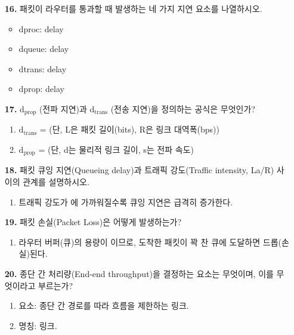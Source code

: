 \documentclass[a4paper, 10pt]{article}
\newcommand{\ansline}[1]{\underline{\hspace{#1}}}
\newcommand{\sectionbox}[1]{
  \vspace{0.5em}
  \noindent\fbox{\textbf{#1}}
  \vspace{0.5em}
}
\begin{document}
\begin{enumerate}[itemsep=2em, leftmargin=2em, label={}]
\item[] \sectionbox{IV. 성능: 지연, 손실, 처리량 (5문제)}

\item[\textbf{16.}] 패킷이 라우터를 통과할 때 발생하는 네 가지 지연 요소를 나열하시오.
\begin{itemize}[itemsep=0.3em, leftmargin=1.5em]
    \item dproc: \ansline{3cm} delay
    \item dqueue: \ansline{3cm} delay
    \item dtrans: \ansline{3cm} delay
    \item dprop: \ansline{3cm} delay
\end{itemize}

\item[\textbf{17.}] $\text{d}_{\text{prop}}$ (전파 지연)과 $\text{d}_{\text{trans}}$ (전송 지연)을 정의하는 공식은 무엇인가?
\begin{enumerate}[label=\alph*., itemsep=0.3em, leftmargin=1.5em]
    \item $\text{d}_{\text{trans}}$ = \ansline{4cm} (단, L은 패킷 길이(bits), R은 링크 대역폭(bps))
    \item $\text{d}_{\text{prop}}$ = \ansline{4cm} (단, d는 물리적 링크 길이, s는 전파 속도)
\end{enumerate}

\item[\textbf{18.}] 패킷 큐잉 지연(Queueing delay)과 트래픽 강도(Traffic intensity, La/R) 사이의 관계를 설명하시오.
\begin{enumerate}[label=\alph*., itemsep=0.3em, leftmargin=1.5em]
    \item 트래픽 강도가 \ansline{4cm}에 가까워질수록 큐잉 지연은 급격히 증가한다.
\end{enumerate}

\item[\textbf{19.}] 패킷 손실(Packet Loss)은 어떻게 발생하는가?
\begin{enumerate}[label=\alph*., itemsep=0.3em, leftmargin=1.5em]
    \item 라우터 버퍼(큐)의 용량이 \ansline{4cm}이므로, 도착한 패킷이 꽉 찬 큐에 도달하면 드롭(손실)된다.
\end{enumerate}

\item[\textbf{20.}] 종단 간 처리량(End-end throughput)을 결정하는 요소는 무엇이며, 이를 무엇이라고 부르는가?
\begin{enumerate}[label=\alph*., itemsep=0.3em, leftmargin=1.5em]
    \item 요소: 종단 간 경로를 따라 흐름을 제한하는 링크.
    \item 명칭: \ansline{4cm} 링크.
\end{enumerate}



\end{enumerate}
\end{document}
